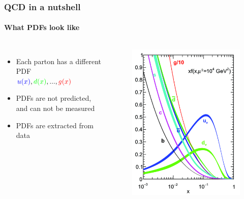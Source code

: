 \documentclass[aspectratio=43]{beamer}
\begin{document}
\begin{frame}

	\frametitle{QCD in a nutshell}
	\framesubtitle{What PDFs look like}
	
	\begin{columns}
	
		\begin{itemize}
			\item Each parton has a different PDF \\ ${\color{blue}u(x)}, {\color{green}d(x)}, ..., {\color{red}g(x)}$
			\item PDFs are not predicted, and can not be measured
			\item PDFs are {\color{blue}extracted} from data
		\end{itemize}

		\begin{figure}
			\includegraphics[width = 3.8 cm]{PDF.png}
		\end{figure}

	\end{columns}

\end{frame}

\begin{frame}
	

\end{frame}
\end{document}

